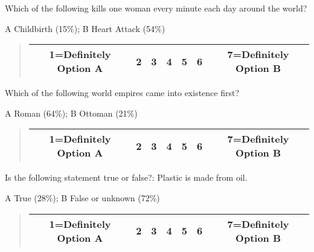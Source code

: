 \documentclass[11pt]{article}
\begin{document}
\begin{tcolorbox}
Which of the following kills one woman every minute each day around the world?     \\
\begin{center}
A Childbirth (15\%); B Heart Attack (54\%)
\end{center}

\begin{quote}
\begin{center}
	\begin{tabular}{|c|c|c|c|c|c|c|}
\hline
		1=Definitely Option A & 2 & 3 & 4 & 5 & 6 & 7=Definitely Option B \\ \hline
\end{tabular}
\end{center}
\end{quote}
\end{tcolorbox}
\begin{tcolorbox}
Which of the following world empires came into existence first?  \\
\begin{center}
A Roman (64\%); B Ottoman (21\%)
\end{center}

\begin{quote}
\begin{center}
	\begin{tabular}{|c|c|c|c|c|c|c|}
\hline
		1=Definitely Option A & 2 & 3 & 4 & 5 & 6 & 7=Definitely Option B \\ \hline
\end{tabular}
\end{center}
\end{quote}
\end{tcolorbox}
\begin{tcolorbox}
Is the following statement true or false?: Plastic is made from oil.  \\
\begin{center}
A True (28\%); B False or unknown (72\%)
\end{center}

\begin{quote}
\begin{center}
	\begin{tabular}{|c|c|c|c|c|c|c|}
\hline
		1=Definitely Option A & 2 & 3 & 4 & 5 & 6 & 7=Definitely Option B \\ \hline
\end{tabular}
\end{center}
\end{quote}
\end{tcolorbox}
\end{document}
